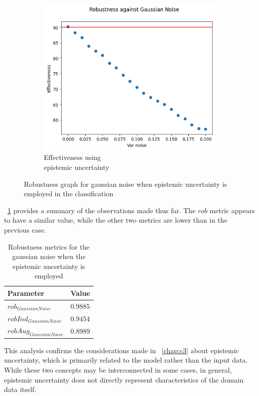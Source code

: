 \begin{figure}[h]
	\begin{subfigure}{.33\textwidth}
		\centering
		\includegraphics[width=0.9\linewidth]{ImageFiles/EvalBNN/GN/EU/eff}
		\caption{Effectiveness using \\ epistemic uncertainty}
		\label{fig:gn_eu_eff}
	\end{subfigure}
	\caption{Robustness graph for gaussian noise when epistemic uncertainty is employed in the classification}
	\label{fig:gn_eu}
\end{figure}

\Tab~\ref{table:rob_gn_eu} provides a summary of the observations made thus far. The $rob$ metric appears to have a similar value, while the other two metrics are lower than in the previous case.

\begin{table}[h]
	\centering
	\begin{tabular}{|| l | l ||} 
		\hline
		\textbf{Parameter} & \textbf{Value} \\
		\hline
		\hline
		$rob_{GaussianNoise}$ & $0.9885$ \\
		$robInd_{GaussianNoise}$ & $0.9454$ \\
		$robAug_{GaussianNoise}$ & $0.8989$ \\	
		\hline
	\end{tabular}	
	\caption{Robustness metrics for the gaussian noise when the epistemic uncertainty is employed}
	\label{table:rob_gn_eu}
\end{table}

This analysis confirms the considerations made in \Chap~\ref{chap:c3} about epistemic uncertainty, which is primarily related to the model rather than the input data. While these two concepts may be interconnected in some cases, in general, epistemic uncertainty does not directly represent characteristics of the domain data itself.


